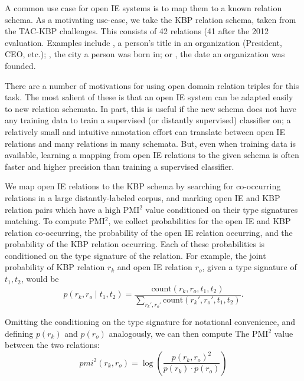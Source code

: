 A common use case for open IE systems is to map them to a
  known relation schema.
As a motivating use-case, we take the KBP relation schema, taken from
  the TAC-KBP challenges.
This consists of 42 relations (41 after the 2012 evaluation.
  Examples include , a person's title in an
  organization (President, CEO, etc.); , the
  city a person was born in; or , the date an organization
  was founded.

There are a number of motivations for using open domain
  relation triples for this task.
The most salient of these is that an open IE system can be adapted
  easily to new relation schemata.
In part, this is useful if the new schema does not have any training data
  to train a supervised (or distantly supervised) classifier on; a relatively
  small and intuitive annotation effort can translate between open IE relations
  and many relations in many schemata.
But, even when training data is available, learning a mapping from open IE
  relations to the given schema is often faster and higher precision than
  training a supervised classifier.

We map open IE relations to the KBP schema by searching for co-occurring
  relations in a large distantly-labeled corpus, and marking open IE and
  KBP relation pairs which have a high PMI$^2$ value conditioned on their
  type signatures matching.
To compute PMI$^2$, we collect probabilities for the open IE and KBP
  relation co-occurring, the probability of the open IE relation occurring,
  and the probability of the KBP relation occurring.
Each of these probabilities is conditioned on the type signature of the relation.
For example, the joint probability of KBP relation $r_k$ and open IE relation
  $r_o$, given a type signature of $t_1, t_2$, would be
\begin{equation*}
  p(r_k, r_o \mid t_1, t_2) = \frac{
    \textrm{count}(r_k, r_o,  t_1, t_2)
  }{
    \sum_{r_k', r_o'}\textrm{count}(r_k', r_o', t_1, t_2)
  }.
\end{equation*}

Omitting the conditioning on the type signature for notational convenience,
  and defining $p(r_k)$ and $p(r_o)$ analogously,
  we can then compute The PMI$^2$ value between the two relations:
\begin{equation*}
  pmi^2(r_k, r_o) = \log \left( \frac{p(r_k, r_o)^2}{p(r_k) \cdot p(r_o)} \right)
\end{equation*}

